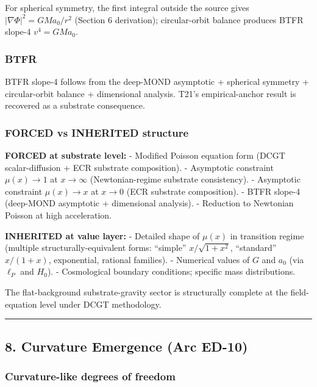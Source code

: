 \documentclass[
  11pt,a4paper]{article}
\begin{document}
For spherical symmetry, the first integral outside the source gives
\(|\nabla\Phi|^2 = GMa_0/r^2\) (Section 6 derivation); circular-orbit
balance produces BTFR slope-4 \(v^4 = GMa_0\).

\subsubsection{BTFR}\label{btfr}

BTFR slope-4 follows from the deep-MOND asymptotic + spherical symmetry
+ circular-orbit balance + dimensional analysis. T21's empirical-anchor
result is recovered as a substrate consequence.

\subsubsection{FORCED vs INHERITED
structure}\label{forced-vs-inherited-structure}

\textbf{FORCED at substrate level:} - Modified Poisson equation form
(DCGT scalar-diffusion + ECR substrate composition). - Asymptotic
constraint \(\mu(x) \to 1\) at \(x \to \infty\) (Newtonian-regime
substrate consistency). - Asymptotic constraint \(\mu(x) \to x\) at
\(x \to 0\) (ECR substrate composition). - BTFR slope-4 (deep-MOND
asymptotic + dimensional analysis). - Reduction to Newtonian Poisson at
high acceleration.

\textbf{INHERITED at value layer:} - Detailed shape of \(\mu(x)\) in
transition regime (multiple structurally-equivalent forms: ``simple''
\(x/\sqrt{1+x^2}\), ``standard'' \(x/(1+x)\), exponential, rational
families). - Numerical values of \(G\) and \(a_0\) (via \(\ell_P\) and
\(H_0\)). - Cosmological boundary conditions; specific mass
distributions.

The flat-background substrate-gravity sector is structurally complete at
the field-equation level under DCGT methodology.

\begin{center}\rule{0.5\linewidth}{0.5pt}\end{center}

\subsection{8. Curvature Emergence (Arc
ED-10)}\label{curvature-emergence-arc-ed-10}

\subsubsection{Curvature-like degrees of
freedom}\label{curvature-like-degrees-of-freedom}
\end{document}
